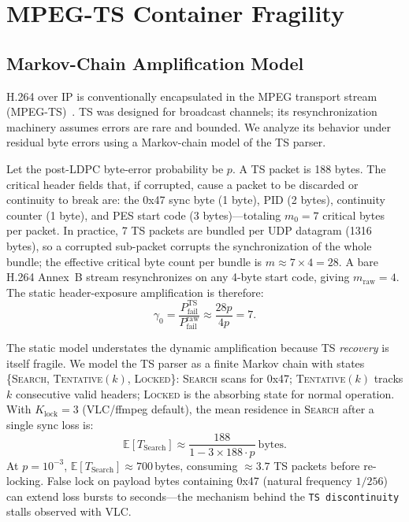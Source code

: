 \documentclass[conference]{IEEEtran}
\begin{document}
\section{MPEG-TS Container Fragility}
\label{sec:container}

\subsection{Markov-Chain Amplification Model}

H.264 over IP is conventionally encapsulated in the MPEG transport stream (MPEG-TS)~\cite{iso13818}. TS was designed for broadcast channels; its resynchronization machinery assumes errors are rare and bounded. We analyze its behavior under residual byte errors using a Markov-chain model of the TS parser.

Let the post-LDPC byte-error probability be $p$. A TS packet is 188 bytes. The critical header fields that, if corrupted, cause a packet to be discarded or continuity to break are: the 0x47 sync byte (1 byte), PID (2 bytes), continuity counter (1 byte), and PES start code (3 bytes)---totaling $m_0=7$ critical bytes per packet. In practice, 7 TS packets are bundled per UDP datagram (1316 bytes), so a corrupted sub-packet corrupts the synchronization of the whole bundle; the effective critical byte count per bundle is $m \approx 7\times4 = 28$. A bare H.264 Annex~B stream resynchronizes on any 4-byte start code, giving $m_\text{raw}=4$. The static header-exposure amplification is therefore:
\begin{equation}
  \gamma_0 = \frac{P_\text{fail}^\text{TS}}{P_\text{fail}^\text{raw}} \approx \frac{28p}{4p} = 7.
  \label{eq:gamma_static}
\end{equation}

The static model understates the dynamic amplification because TS \emph{recovery} is itself fragile. We model the TS parser as a finite Markov chain with states \{\textsc{Search}, \textsc{Tentative}$(k)$, \textsc{Locked}\}: \textsc{Search} scans for 0x47; \textsc{Tentative}$(k)$ tracks $k$ consecutive valid headers; \textsc{Locked} is the absorbing state for normal operation. With $K_\text{lock}=3$ (VLC/ffmpeg default), the mean residence in \textsc{Search} after a single sync loss is:
\begin{equation}
  \mathbb{E}[T_\text{Search}] \approx \frac{188}{1 - 3\times188\cdot p}\ \text{bytes}.
  \label{eq:markov_mean}
\end{equation}
At $p=10^{-3}$, $\mathbb{E}[T_\text{Search}]\approx700$\,bytes, consuming $\approx\!3.7$ TS packets before re-locking. False lock on payload bytes containing 0x47 (natural frequency $1/256$) can extend loss bursts to seconds---the mechanism behind the \texttt{TS discontinuity} stalls observed with VLC.
\end{document}
